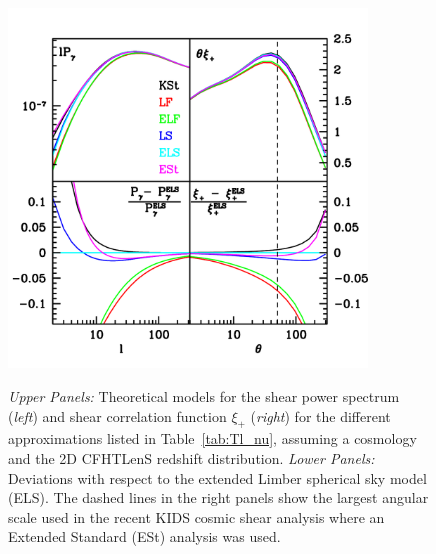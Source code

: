  \begin{figure}
 \begin{center}
 \includegraphics[width=0.85\textwidth]{figures/Cl_xi_comp.pdf}
 \label{fig:Cl_xi}
 \caption{\emph{Upper Panels:} Theoretical models for the shear power spectrum (\emph{left}) and shear correlation function $\xi_+$ (\emph{right}) for the different approximations listed in Table~\ref{tab:Tl_nu}, assuming a \citet{planck/cosmo:2015} cosmology and the 2D CFHTLenS redshift distribution. \emph{Lower Panels:} Deviations with respect to the extended Limber spherical sky model (ELS).    The dashed lines in the right panels show the largest angular scale used in the recent KIDS cosmic shear analysis where an Extended Standard (ESt) analysis was used.}
 \end{center}
 \end{figure}
 
